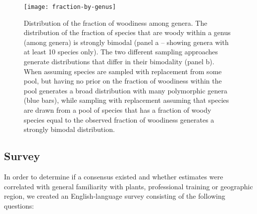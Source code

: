 \documentclass[12pt]{article}
\begin{document}
\begin{figure}[p]
  \centering
  \texttt{[image: fraction-by-genus]}
  \caption{Distribution of the fraction of woodiness among genera.
    The distribution of the fraction of species that are woody within
    a genus (among genera) is strongly bimodal (panel a -- showing
    genera with at least 10 species only).
    The two different sampling approaches generate distributions that
    differ in their bimodality (panel b).  When assuming species are
    sampled with replacement from some pool, but having no prior on
    the fraction of woodiness within the pool generates a broad
    distribution with many polymorphic genera (blue bars), while
    sampling with replacement assuming that species are drawn from a
    pool of species that has a fraction of woody species equal to the
    observed fraction of woodiness generates a strongly bimodal
    distribution.}
  \label{fig:distribution-genera}
\end{figure}



\subsection{Survey}
In order to determine if a consensus existed and whether estimates were correlated with general familiarity with plants, professional training or geographic region, we created an English-language survey consisting of the following questions:
\end{document}
